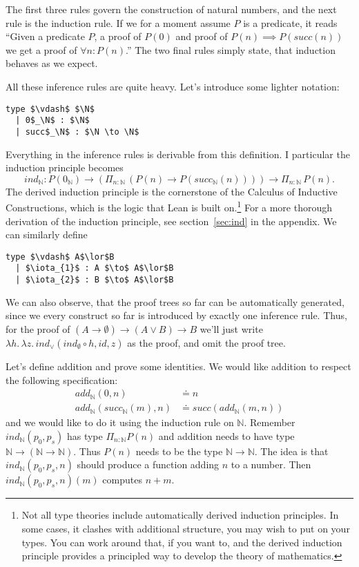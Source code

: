 \documentclass[a4paper, 12pt]{article}
\newcommand{\N}{\mathbb{N}}
\newcommand{\la}[1]{\lambda{#1}.\,}
\theoremstyle{changedot}
\theoremstyle{changedotbreak}
\theoremstyle{nonumberplain}
\begin{document}
The first three rules govern the construction of natural numbers, and the next rule is the induction rule. If we for a moment assume $P$ is a predicate, it reads ``Given a predicate $P$, a proof of $P(0)$ and proof of $P(n) \implies P(succ(n))$ we get a proof of $\forall n: P(n)$.'' The two final rules simply state, that induction behaves as we expect.

All these inference rules are quite heavy. Let's introduce some lighter notation:

\begin{lstlisting}[mathescape=true]
  type $\vdash$ $\N$
  | 0$_\N$ : $\N$
  | succ$_\N$ : $\N \to \N$
\end{lstlisting}

Everything in the inference rules is derivable from this definition. I particular the induction principle becomes \[ind_{\N} : P(0_{\N}) \to (\Pi_{n:\N}\, (P(n) \to P(succ_{\N}(n)))) \to \Pi_{n:\N}\, P(n).\] The derived induction principle is the cornerstone of the Calculus of Inductive Constructions, which is the logic that Lean is built on.\footnote{Not all type theories include automatically derived induction principles. In some cases, it clashes with additional structure, you may wish to put on your types. You can work around that, if you want to, and the derived induction principle provides a principled way to develop the theory of mathematics.} For a more thorough derivation of the induction principle, see section~\ref{sec:ind} in the appendix. We can similarly define

\begin{lstlisting}[mathescape=true]
  type $\vdash$ A$\lor$B
  | $\iota_{1}$ : A $\to$ A$\lor$B
  | $\iota_{2}$ : B $\to$ A$\lor$B
\end{lstlisting}

We can also observe, that the proof trees so far can be automatically generated, since we every construct so far is introduced by exactly one inference rule. Thus, for the proof of $(A \to \emptyset) \to (A \lor B) \to B$ we'll just write $\la h \la z ind_{\lor}(ind_{\emptyset} \circ h, id, z)$ as the proof, and omit the proof tree.

Let's define addition and prove some identities. We would like addition to respect the following specification:
\begin{align*}
  \mathit{add}_{\N} (0, n) &\doteq n \\
  \mathit{add}_{\N} (succ_{\N}(m), n) &\doteq succ(\mathit{add}_{\N}(m, n))
\end{align*}
and we would like to do it using the induction rule on $\N$. Remember $ind_{\N}(p_{0}, p_{s})$ has type $\Pi_{n:\N} P(n)$ and addition needs to have type $\N \to (\N \to \N)$. Thus $P(n)$ needs to be the type $\N \to \N$. The idea is that $ind_{\N}(p_{0}, p_{s}, n)$ should produce a function adding $n$ to a number. Then $ind_{\N}(p_{0}, p_{s}, n)(m)$ computes $n+m$.
\end{document}
